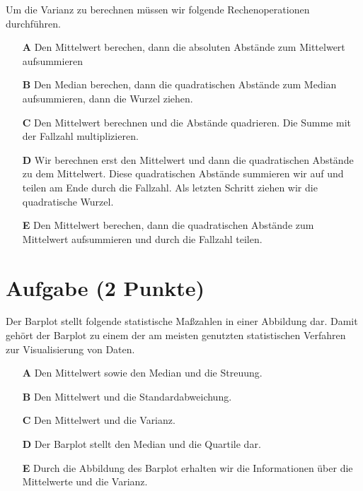 \documentclass[a4paper, 9pt]{scrartcl}\usepackage[]{graphicx}\usepackage[]{xcolor}
\begin{document}
Um die Varianz zu berechnen müssen wir folgende Rechenoperationen durchführen.



\begin{enumerate}
\item [\textbf{A} \msquare] Den Mittelwert berechen, dann die absoluten Abstände zum Mittelwert aufsummieren
\item [\textbf{B} \msquare] Den Median berechen, dann die quadratischen Abstände zum Median aufsummieren, dann die Wurzel ziehen.
\item [\textbf{C} \msquare] Den Mittelwert berechnen und die Abstände quadrieren. Die Summe mit der Fallzahl multiplizieren.
\item [\textbf{D} \msquare] Wir berechnen erst den Mittelwert und dann die quadratischen Abstände zu dem Mittelwert. Diese quadratischen Abstände summieren wir auf und teilen am Ende durch die Fallzahl. Als letzten Schritt ziehen wir die quadratische Wurzel.
\item [\textbf{E} \msquare] Den Mittelwert berechen, dann die quadratischen Abstände zum Mittelwert aufsummieren und durch die Fallzahl teilen.
\end{enumerate} 

\section{Aufgabe \hfill (2 Punkte)}



Der Barplot stellt folgende statistische Maßzahlen in einer Abbildung dar. Damit gehört der Barplot zu einem der am meisten genutzten statistischen Verfahren zur Visualisierung von Daten.

 



\begin{enumerate}
\item [\textbf{A} \msquare] Den Mittelwert sowie den Median und die Streuung.
\item [\textbf{B} \msquare] Den Mittelwert und die Standardabweichung.
\item [\textbf{C} \msquare] Den Mittelwert und die Varianz.
\item [\textbf{D} \msquare] Der Barplot stellt den Median und die Quartile dar.
\item [\textbf{E} \msquare] Durch die Abbildung des Barplot erhalten wir die Informationen über die Mittelwerte und die Varianz.
\end{enumerate}
\end{document}
